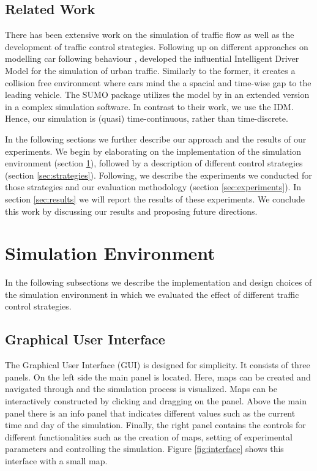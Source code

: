 \documentclass[10pt]{article}
\begin{document}
\vspace{20pt}

\subsection{Related Work}
\label{sec:related-work}
There has been extensive work on the simulation of traffic flow as well as the development of traffic control strategies. Following up on different approaches on modelling car following behaviour \citep[e.g.][]{gipps1981behavioural}, \citet{treiber2000congested} developed the influential Intelligent Driver Model for the simulation of urban traffic. Similarly to the former, it creates a collision free environment where cars mind the a spacial and time-wise gap to the leading vehicle. The SUMO package \citep{krajzewicz2002sumo, behrisch2011sumo} utilizes the model by \citep{gipps1981behavioural} in an extended version \citep{krauss1998microscopic} in a complex simulation software. In contrast to their work, we use the IDM. Hence, our simulation is (quasi) time-continuous, rather than time-discrete.

In the following sections we further describe our approach and the results of our experiments. We begin by elaborating on the implementation of the simulation environment (section \ref{sec:envi}), followed by a description of different control strategies (section \ref{sec:strategies}). Following, we describe the experiments we conducted for those strategies and our evaluation methodology (section \ref{sec:experiments}). In section \ref{sec:results} we will report the results of these experiments. We conclude this work by discussing our results and proposing future directions.
	
\section{Simulation Environment}
\label{sec:envi}
In the following subsections we describe the implementation and design choices of the simulation environment in which we evaluated the effect of different traffic control strategies.

\subsection{Graphical User Interface}
The Graphical User Interface (GUI) is designed for simplicity. It consists of three  panels. On the left side the main panel is located. Here, maps can be created and navigated through and the simulation process is visualized. Maps can be interactively constructed by clicking and dragging on the panel. Above the main panel there is an info panel that indicates different values such as the current time and day of the simulation. Finally, the right panel contains the controls for different functionalities such as the creation of maps, setting of experimental parameters and controlling the simulation. Figure \ref{fig:interface} shows this interface with a small map.
\end{document}
